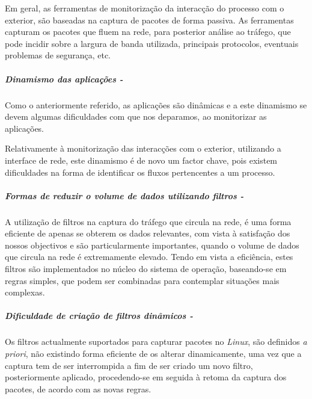 % 
% 

Em geral, as ferramentas de monitorização da interacção do processo com o exterior, são baseadas na captura de pacotes de forma passiva.
As ferramentas capturam os pacotes que fluem na rede, para posterior análise ao tráfego, que pode incidir sobre a largura de banda utilizada, principais protocolos, eventuais problemas de segurança, etc.

\subparagraph*{Dinamismo das aplicações - }
Como o anteriormente referido, as aplicações são dinâmicas e a este dinamismo se devem algumas dificuldades com que nos deparamos, ao monitorizar as aplicações.

Relativamente à monitorização das interacções com o exterior, utilizando a interface de rede, este dinamismo é de novo um factor chave, pois existem dificuldades na forma de identificar os fluxos pertencentes a um processo.

\subparagraph*{Formas de reduzir o volume de dados utilizando filtros - }
A utilização de filtros na captura do tráfego que circula na rede, é uma forma eficiente de apenas se obterem os dados relevantes, com vista à satisfação dos nossos objectivos e são particularmente importantes, quando o volume de dados que circula na rede é extremamente elevado.
Tendo em vista a eficiência, estes filtros são implementados no núcleo do sistema de operação, baseando-se em regras simples, que podem ser combinadas para contemplar situações mais complexas.

\subparagraph*{Dificuldade de criação de filtros dinâmicos - }
Os filtros actualmente suportados para capturar pacotes no \textit{Linux}, são definidos \textit{a priori}, não existindo forma eficiente de os alterar dinamicamente, uma vez que a captura tem de ser interrompida a fim de ser criado um novo filtro, posteriormente aplicado, procedendo-se em seguida à retoma da captura dos pacotes, de acordo com as novas regras.

